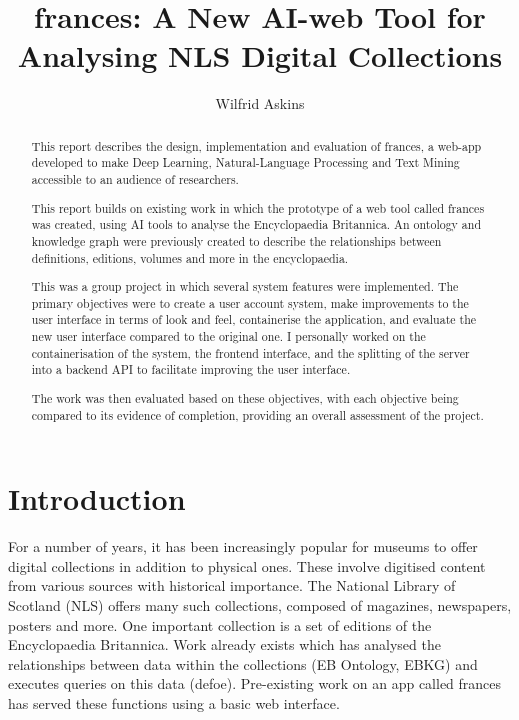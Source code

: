 \documentclass[12pt, letterpaper]{article}
\begin{document}
\title{frances: A New AI-web Tool for Analysing NLS Digital Collections}
\author{Wilfrid Askins}
\maketitle

\begin{abstract}
This report describes the design, implementation and evaluation of frances, a web-app developed to make Deep Learning, Natural-Language Processing and Text Mining accessible to an audience of researchers. 

This report builds on existing work in which the prototype of a web tool called frances was created, using AI tools to analyse the Encyclopaedia Britannica. An ontology and knowledge graph were previously created to describe the relationships between definitions, editions, volumes and more in the encyclopaedia.

This was a group project in which several system features were implemented. The primary objectives were to create a user account system, make improvements to the user interface in terms of look and feel, containerise the application, and evaluate the new user interface compared to the original one. I personally worked on the containerisation of the system, the frontend interface, and the splitting of the server into a backend API to facilitate improving the user interface.

The work was then evaluated based on these objectives, with each objective being compared to its evidence of completion, providing an overall assessment of the project.

\end{abstract}

\tableofcontents

\section{Introduction}

\begin{flushleft}
For a number of years, it has been increasingly popular for museums to offer digital collections in addition to physical ones. These involve digitised content from various sources with historical importance. The National Library of Scotland (NLS) offers many such collections, composed of magazines, newspapers, posters and more. One important collection is a set of editions of the Encyclopaedia Britannica. Work already exists which has analysed the relationships between data within the collections (EB Ontology, EBKG) and executes queries on this data (defoe). Pre-existing work on an app called frances has served these functions using a basic web interface.
\end{flushleft}
\end{document}
